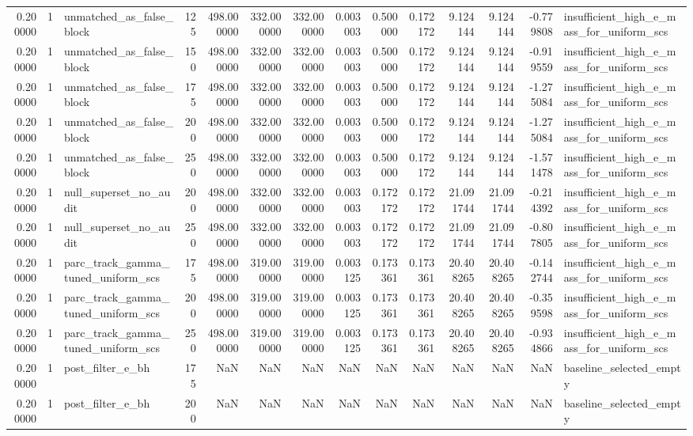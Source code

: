 \begin{tabular}{rrlrrrrrrrrrrl}
0.200000 & 1 & unmatched_as_false_block & 125 & 498.000000 & 332.000000 & 332.000000 & 0.003003 & 0.500000 & 0.172172 & 9.124144 & 9.124144 & -0.779808 & insufficient_high_e_mass_for_uniform_scs \\
0.200000 & 1 & unmatched_as_false_block & 150 & 498.000000 & 332.000000 & 332.000000 & 0.003003 & 0.500000 & 0.172172 & 9.124144 & 9.124144 & -0.919559 & insufficient_high_e_mass_for_uniform_scs \\
0.200000 & 1 & unmatched_as_false_block & 175 & 498.000000 & 332.000000 & 332.000000 & 0.003003 & 0.500000 & 0.172172 & 9.124144 & 9.124144 & -1.275084 & insufficient_high_e_mass_for_uniform_scs \\
0.200000 & 1 & unmatched_as_false_block & 200 & 498.000000 & 332.000000 & 332.000000 & 0.003003 & 0.500000 & 0.172172 & 9.124144 & 9.124144 & -1.275084 & insufficient_high_e_mass_for_uniform_scs \\
0.200000 & 1 & unmatched_as_false_block & 250 & 498.000000 & 332.000000 & 332.000000 & 0.003003 & 0.500000 & 0.172172 & 9.124144 & 9.124144 & -1.571478 & insufficient_high_e_mass_for_uniform_scs \\
0.200000 & 1 & null_superset_no_audit & 200 & 498.000000 & 332.000000 & 332.000000 & 0.003003 & 0.172172 & 0.172172 & 21.091744 & 21.091744 & -0.214392 & insufficient_high_e_mass_for_uniform_scs \\
0.200000 & 1 & null_superset_no_audit & 250 & 498.000000 & 332.000000 & 332.000000 & 0.003003 & 0.172172 & 0.172172 & 21.091744 & 21.091744 & -0.807805 & insufficient_high_e_mass_for_uniform_scs \\
0.200000 & 1 & parc_track_gamma_tuned_uniform_scs & 175 & 498.000000 & 319.000000 & 319.000000 & 0.003125 & 0.173361 & 0.173361 & 20.408265 & 20.408265 & -0.142744 & insufficient_high_e_mass_for_uniform_scs \\
0.200000 & 1 & parc_track_gamma_tuned_uniform_scs & 200 & 498.000000 & 319.000000 & 319.000000 & 0.003125 & 0.173361 & 0.173361 & 20.408265 & 20.408265 & -0.359598 & insufficient_high_e_mass_for_uniform_scs \\
0.200000 & 1 & parc_track_gamma_tuned_uniform_scs & 250 & 498.000000 & 319.000000 & 319.000000 & 0.003125 & 0.173361 & 0.173361 & 20.408265 & 20.408265 & -0.934866 & insufficient_high_e_mass_for_uniform_scs \\
0.200000 & 1 & post_filter_e_bh & 175 & NaN & NaN & NaN & NaN & NaN & NaN & NaN & NaN & NaN & baseline_selected_empty \\
0.200000 & 1 & post_filter_e_bh & 200 & NaN & NaN & NaN & NaN & NaN & NaN & NaN & NaN & NaN & baseline_selected_empty \\

\end{tabular}
